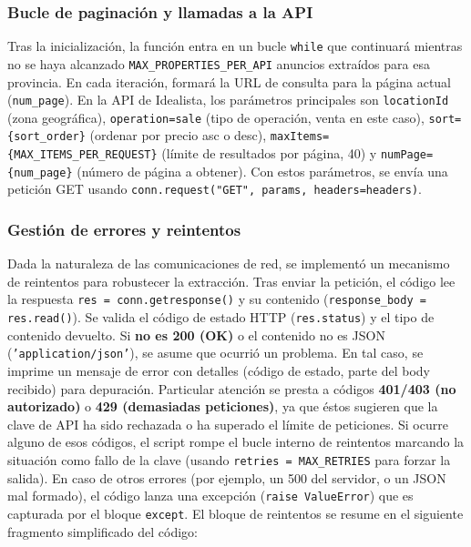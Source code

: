 \documentclass[a4paper,11pt]{book}
\begin{document}
\subsubsection*{Bucle de paginación y llamadas a la API}
Tras la inicialización, la función entra en un bucle \texttt{while} que continuará mientras no se haya alcanzado \texttt{MAX\_PROPERTIES\_PER\_API} anuncios extraídos para esa provincia. En cada iteración, formará la URL de consulta para la página actual (\texttt{num\_page}). En la API de Idealista, los parámetros principales son \texttt{locationId} (zona geográfica), \texttt{operation=sale} (tipo de operación, venta en este caso), \texttt{sort=\{sort\_order\}} (ordenar por precio asc o desc), \texttt{maxItems=\{MAX\_ITEMS\_PER\_REQUEST\}} (límite de resultados por página, 40) y \texttt{numPage=\{num\_page\}} (número de página a obtener). Con estos parámetros, se envía una petición GET usando \texttt{conn.request("GET", params, headers=headers)}.

\subsubsection*{Gestión de errores y reintentos}
Dada la naturaleza de las comunicaciones de red, se implementó un mecanismo de reintentos para robustecer la extracción. Tras enviar la petición, el código lee la respuesta \texttt{res = conn.getresponse()} y su contenido (\texttt{response\_body = res.read()}). Se valida el código de estado HTTP (\texttt{res.status}) y el tipo de contenido devuelto. Si \textbf{no es 200 (OK)} o el contenido no es JSON (\texttt{'application/json'}), se asume que ocurrió un problema. En tal caso, se imprime un mensaje de error con detalles (código de estado, parte del body recibido) para depuración. Particular atención se presta a códigos \textbf{401/403 (no autorizado)} o \textbf{429 (demasiadas peticiones)}, ya que éstos sugieren que la clave de API ha sido rechazada o ha superado el límite de peticiones. Si ocurre alguno de esos códigos, el script rompe el bucle interno de reintentos marcando la situación como fallo de la clave (usando \texttt{retries = MAX\_RETRIES} para forzar la salida). En caso de otros errores (por ejemplo, un 500 del servidor, o un JSON mal formado), el código lanza una excepción (\texttt{raise ValueError}) que es capturada por el bloque \texttt{except}. El bloque de reintentos se resume en el siguiente fragmento simplificado del código:
\end{document}
